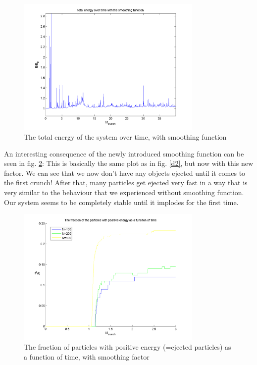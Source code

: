 \documentclass[10pt,a4paper]{article}
\begin{document}
\begin{figure}[h]
	\caption{The total energy of the system over time, with smoothing 		function\label{e1}}
	\includegraphics[width=0.8\textwidth]{e1.png}
\end{figure}

An interesting consequence of the newly introduced smoothing function can be seen in fig. \ref{e2}: This is basically the same plot as in fig. \ref{d2}, but now with this new factor. We can see that we now don't have any objects ejected until it comes to the first crunch! After that, many particles get ejected very fast in a way that is very similar to the behaviour that we experienced without smoothing function. Our system seems to be completely stable until it implodes for the first time.

\begin{figure}[h]
	\caption{The fraction of particles with positive energy (=ejected particles) as a function of time, with smoothing factor\label{e2}}
	\includegraphics[width=0.8\textwidth]{e2.png}
\end{figure}
\end{document}
